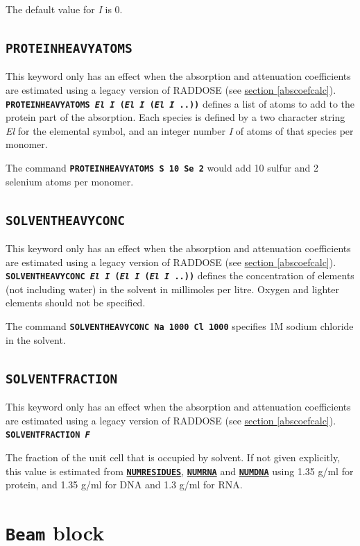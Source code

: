 \documentclass[a4paper]{article}
\newcommand{\Class}[1]{\texttt{#1}\xspace}
\newcommand{\Keyword}[1]{\texttt{\textbf{#1}}\xspace}
\newcommand{\SB}{\\[0.2em]}
\newcommand{\RDLegacyKeyword}{This keyword only has an effect when the absorption and attenuation coefficients are estimated using a legacy version of RADDOSE (see \hyperref[abscoefcalc]{section \ref*{abscoefcalc}}).\SB
}
\begin{document}
The default value for \textit{I} is 0.


\subsection{\Keyword{PROTEINHEAVYATOMS}}
\label{proteinheavyatoms}
\RDLegacyKeyword

\noindent \Keyword{PROTEINHEAVYATOMS \textit{El I} (\textit{El I} (\textit{El I} ..))}
defines a list of atoms to add to the protein part of the absorption. Each species is defined by a two character string \textit{El} for the elemental symbol, and an integer number \textit{I} of atoms of that species per monomer.

The command \Keyword{PROTEINHEAVYATOMS S 10 Se 2} would add 10 sulfur and 2 selenium atoms per monomer.


\subsection{\Keyword{SOLVENTHEAVYCONC}}
\label{solventheavyconc}
\RDLegacyKeyword

\noindent \Keyword{SOLVENTHEAVYCONC \textit{El I} (\textit{El I} (\textit{El I} ..))}
defines the concentration of elements (not including water) in the solvent in millimoles per litre. Oxygen and lighter elements should not be specified.

The command \Keyword{SOLVENTHEAVYCONC Na 1000 Cl 1000} specifies 1M sodium chloride in the solvent.


\subsection{\Keyword{SOLVENTFRACTION}}
\label{solventfraction}
\RDLegacyKeyword

\noindent \Keyword{SOLVENTFRACTION \textit{F}}

The fraction of the unit cell that is occupied by solvent. If not given explicitly, this value is estimated from \hyperref[numresidues]{\Keyword{NUMRESIDUES}}, \hyperref[numrna]{\Keyword{NUMRNA}} and \hyperref[numdna]{\Keyword{NUMDNA}} using 1.35 g/ml for protein, and 1.35 g/ml for DNA and 1.3 g/ml for RNA.



\label{RDv3End}


\section{\Class{Beam} block}
\end{document}
